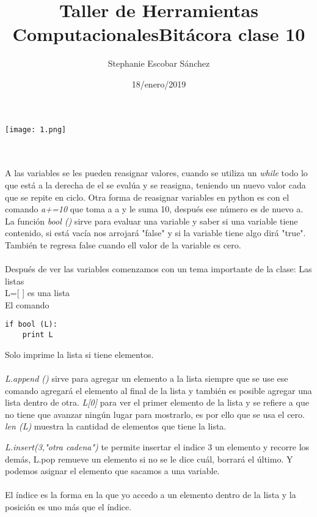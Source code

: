 \documentclass{article}
\title{\Huge Taller de Herramientas Computacionales}
\author{Stephanie Escobar Sánchez}
\date{18/enero/2019}
\begin{document}
	\maketitle
\begin{center}
	\texttt{[image: 1.png]}	
\end{center}
\newpage
\title{\Huge Bitácora clase 10} \\
\\

A las variables se les pueden reasignar valores, cuando se utiliza un \textit{while} todo lo que está a la derecha de el se evalúa y se reasigna, teniendo un nuevo valor cada que se repite en ciclo. Otra forma de reasignar variables en python es con el comando \textit{a+=10} que toma a a y le suma 10, después ese número es de nuevo a. La función \textit{bool ()} sirve para evaluar una variable y saber si una variable tiene contenido, si está vacía nos arrojará "false" y si la variable tiene algo dirá "true". También te regresa false cuando ell valor de la variable es cero.\\
\\Después de ver las variables comenzamos con un tema importante de la clase: Las listas\\
L=[ ] es una lista\\
El comando \begin{verbatim}
if bool (L):
	print L 
\end{verbatim}
Solo imprime la lista si tiene elementos.\\
\\

\textit{L.append ()} sirve para agregar un elemento a la lista siempre que se use ese comando agregará el elemento al final de la lista y también es posible agregar una lista dentro de otra. \textit{L[0]} para ver el primer elemento de la lista y se refiere a que no tiene que avanzar ningún lugar para mostrarlo, es por ello que se usa el cero. \textit{len (L)} muestra la cantidad de elementos que tiene la lista. 

\textit{L.insert(3,"otra cadena")} te permite insertar el  indice 3 un elemento y recorre los demás,  L.pop remueve un elemento si no se le dice cuál, borrará el último. Y podemos asignar el elemento que sacamos a una variable.\\
\\

El índice es la forma en la que yo accedo a un elemento dentro de la lista y la posición es uno más que el índice.\\
\end{document}
